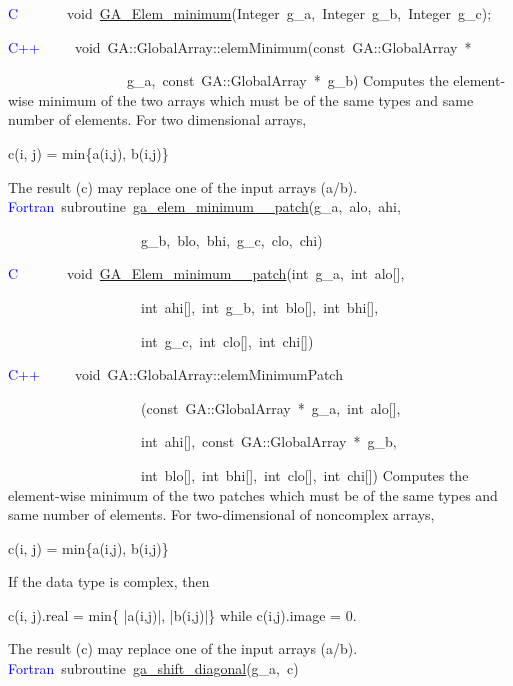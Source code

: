 \textcolor{blue}{C}~~~~~~~void~\href{http://www.emsl.pnl.gov/docs/global/c_nga_ops.html\#ga_elem_minimum}{GA\_{}Elem\_{}minimum}(Integer~g\_a,~Integer~g\_b,~Integer~g\_c);

\textcolor{blue}{C++~}~~~~void~GA::GlobalArray::elemMinimum(const~GA::GlobalArray~{*}

~~~~~~~~~~~~~~~~~g\_a,~const~GA::GlobalArray~{*}~g\_b)
Computes the element-wise minimum of the two arrays which must be
of the same types and same number of elements. For two dimensional
arrays,

c(i, j) = min\{a(i,j), b(i,j)\}

The result (c) may replace one of the input arrays (a/b). 
\textcolor{blue}{Fortran}~subroutine~\href{http://www.emsl.pnl.gov/docs/global/ga_ops.html\#ga_elem_minimum_patch}{ga\_{}elem\_{}minimum\_{}\_{}patch}(g\_a,~alo,~ahi,

~~~~~~~~~~~~~~~~~~~g\_b,~blo,~bhi,~g\_c,~clo,~chi)~

\textcolor{blue}{C}~~~~~~~void~\href{http://www.emsl.pnl.gov/docs/global/c_nga_ops.html\#ga_elem_minimum_patch}{GA\_{}Elem\_{}minimum\_{}\_{}patch}(int~g\_a,~int~alo{[}{]},~

~~~~~~~~~~~~~~~~~~~int~ahi{[}{]},~int~g\_b,~int~blo{[}{]},~int~bhi{[}{]},~

~~~~~~~~~~~~~~~~~~~int~g\_c,~int~clo{[}{]},~int~chi{[}{]})

\textcolor{blue}{C++}~~~~~void~GA::GlobalArray::elemMinimumPatch~~

~~~~~~~~~~~~~~~~~~~(const~GA::GlobalArray~{*}~g\_a,~int~alo{[}{]},~

~~~~~~~~~~~~~~~~~~~int~ahi{[}{]},~const~GA::GlobalArray~{*}~g\_b,~

~~~~~~~~~~~~~~~~~~~int~blo{[}{]},~int~bhi{[}{]},~int~clo{[}{]},~int~chi{[}{]})
Computes the element-wise minimum of the two patches which must be
of the same types and same number of elements. For two-dimensional
of noncomplex arrays,

c(i, j) = min\{a(i,j), b(i,j)\}

If the data type is complex, then

c(i, j).real = min\{ |a(i,j)|, |b(i,j)|\} while c(i,j).image = 0.

The result (c) may replace one of the input arrays (a/b). 
\textcolor{blue}{Fortran}~subroutine~\href{http://www.emsl.pnl.gov/docs/global/ga_ops.html\#ga_shift_diagonal}{ga\_{}shift\_{}diagonal}(g\_a,~c)~

